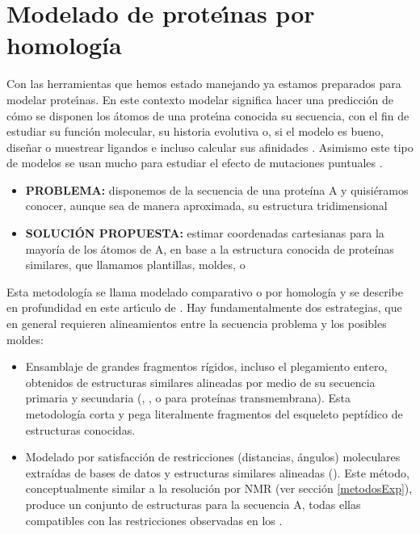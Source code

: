 \section{Modelado de prote\'\i{}nas por homolog\'{i}a} \label{CM}

Con las herramientas que hemos estado manejando ya estamos preparados para modelar prote\'\i{}nas. 
En este contexto modelar significa hacer una predicci\'{o}n de c\'{o}mo se disponen los \'{a}tomos 
de una prote\'\i{}na conocida su secuencia, con el fin de estudiar su funci\'{o}n molecular, su historia evolutiva o, 
si el modelo es bueno, dise\~nar o muestrear ligandos e incluso calcular sus afinidades \citep{Singh2010}. 
Asimismo este tipo de modelos se usan mucho para estudiar el efecto de mutaciones puntuales \citep{Kellogg2011}.

\begin{itemize}
\item \textbf{PROBLEMA:} disponemos de la secuencia de una prote\'{i}na A y quisi\'{e}ramos conocer, aunque sea de manera aproximada, 
su estructura tridimensional
\item \textbf{SOLUCI\'{O}N PROPUESTA:} estimar coordenadas cartesianas para la mayor\'{i}a de los \'{a}tomos de A, 
en base a la estructura conocida de prote\'{i}nas  similares, que llamamos plantillas, moldes, o 
\end{itemize}

Esta metodolog\'{i}a se llama modelado comparativo o por homolog\'{i}a y se describe en profundidad en este
art\'\i{}culo de \citet{Fiser2003}. %
Hay fundamentalmente dos estrategias, que en general requieren alineamientos entre la secuencia problema y los posibles moldes:
\begin{itemize}

\item Ensamblaje de grandes fragmentos r\'{i}gidos, incluso el plegamiento entero, 
obtenidos de estructuras similares alineadas por medio de su secuencia primaria y secundaria
(, 
, 
 o 
 para prote\'{i}nas transmembrana).
Esta metodolog\'{i}a corta y pega literalmente fragmentos del esqueleto pept\'{i}dico de estructuras conocidas.

\item Modelado por satisfacci\'{o}n de restricciones (distancias, \'{a}ngulos) moleculares extra\'{i}das 
de bases de datos y estructuras similares alineadas (). 
Este m\'{e}todo, conceptualmente similar a la resoluci\'{o}n por NMR (ver secci\'{o}n \ref{metodosExp}), 
produce un conjunto de estructuras para la secuencia A, 
todas ellas compatibles con las restricciones observadas en los .

\end{itemize}

